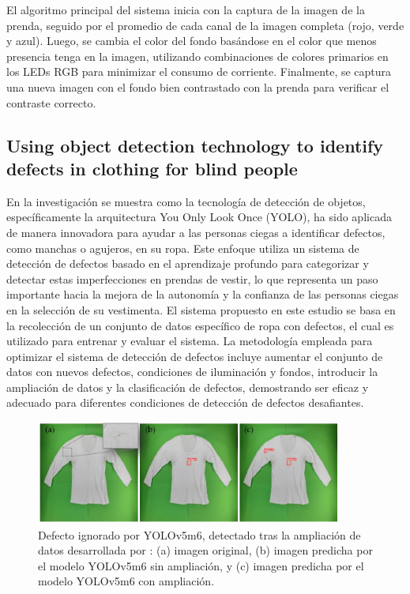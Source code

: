 El algoritmo principal del sistema inicia con la captura de la imagen de la prenda, seguido por el promedio de cada canal de la imagen completa (rojo, verde y azul). Luego, se cambia el color del fondo basándose en el color que menos presencia tenga en la imagen, utilizando combinaciones de colores primarios en los LEDs RGB para minimizar el consumo de corriente. Finalmente, se captura una nueva imagen con el fondo bien contrastado con la prenda para verificar el contraste correcto.

\subsection{Using object detection technology to identify defects in clothing for blind people}

En la investigación \cite{Rocha2023} se muestra como la tecnología de detección de objetos, específicamente la arquitectura You Only Look Once (YOLO), ha sido aplicada de manera innovadora para ayudar a las personas ciegas a identificar defectos, como manchas o agujeros, en su ropa. Este enfoque utiliza un sistema de detección de defectos basado en el aprendizaje profundo para categorizar y detectar estas imperfecciones en prendas de vestir, lo que representa un paso importante hacia la mejora de la autonomía y la confianza de las personas ciegas en la selección de su vestimenta. El sistema propuesto en este estudio se basa en la recolección de un conjunto de datos específico de ropa con defectos, el cual es utilizado para entrenar y evaluar el sistema. La metodología empleada para optimizar el sistema de detección de defectos incluye aumentar el conjunto de datos con nuevos defectos, condiciones de iluminación y fondos, introducir la ampliación de datos y la clasificación de defectos, demostrando ser eficaz y adecuado para diferentes condiciones de detección de defectos desafiantes.

\begin{figure}[H]
	\centering
	\includegraphics[width=0.9\textwidth]{img/example_YOLO.pdf}
	\caption[Defecto ignorado por YOLOv5m6, detectado tras la ampliación de datos.]{Defecto ignorado por YOLOv5m6, detectado tras la ampliación de datos desarrollada por \cite{Rocha2023}: (a) imagen original, (b) imagen predicha por el modelo YOLOv5m6 sin ampliación, y (c) imagen predicha por el modelo YOLOv5m6 con ampliación.}
	\label{fig:example_YOLO}
\end{figure}

